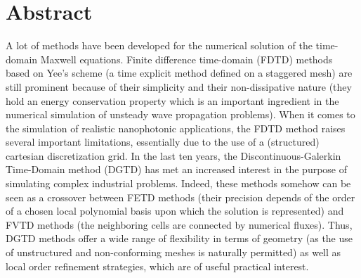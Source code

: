 \documentclass[article, A4, 11pt]{llncs}%
\begin{document}
\section*{Abstract}

A lot of methods have been developed for the numerical solution of the time-domain Maxwell  equations.  Finite difference  time-domain (FDTD) methods based  on Yee's  scheme (a time  explicit method defined  on a staggered mesh)  are still prominent  because of their  simplicity and their  non-dissipative  nature   (they  hold  an  energy  conservation property which is an  important ingredient in the numerical simulation of  unsteady  wave  propagation  problems).   When  it  comes  to  the simulation  of realistic  nanophotonic applications,  the  FDTD method raises several important limitations, essentially  due to the use of a (structured) cartesian  discretization grid.   In the last  ten years, the  Discontinuous-Galerkin  Time-Domain  method  (DGTD)  has  met  an increased  interest in  the purpose  of simulating  complex industrial problems.  Indeed,  these methods somehow  can be seen as  a crossover between FETD methods (their precision depends of the order of a chosen local  polynomial basis upon  which the  solution is  represented) and FVTD  methods  (the  neighboring  cells  are  connected  by  numerical fluxes).   Thus, DGTD  methods offer  a wide  range of  flexibility in terms  of geometry  (as  the use  of  unstructured and  non-conforming meshes  is naturally  permitted)  as well  as  local order  refinement strategies, which are of useful practical interest. 
\end{document}
